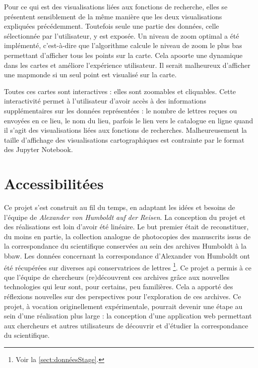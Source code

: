 \documentclass[a4paper, 12pt, twoside]{book}
\begin{document}
Pour ce qui est des visualisations liées aux fonctions de recherche, elles se présentent sensiblement de la même manière que les deux visualisations expliquées précédemment. Toutefois seule une partie des données, celle sélectionnée par l'utilisateur, y est exposée. Un niveau de zoom optimal a été implémenté, c'est-à-dire que l'algorithme calcule le niveau de zoom le plus bas permettant d'afficher tous les points sur la carte. Cela apoorte une dynamique dans les cartes et améliore l'expérience utilisateur. Il serait malheureux d'afficher une mapmonde si un seul point est visualisé sur la carte.

Toutes ces cartes sont interactives : elles sont zoomables et cliquables. Cette interactivité permet à l'utilisateur d'avoir accès à des informations supplémentaires sur les données représentées : le nombre de lettres reçues ou envoyées en ce lieu, le nom du lieu, parfois le lien vers le catalogue en ligne quand il s'agit des visualisations liées aux fonctions de recherches. Malheureusement la taille d'affichage des visualisations cartographiques est contrainte par le format des Jupyter Notebook.

\let\cleardoublepage\clearpage


\chapter{Accessibilitées}
\label{chap:accessibilités}
Ce projet s'est construit au fil du temps, en adaptant les idées et besoins de l'équipe de \textit{Alexander von Humboldt auf der Reisen}. La conception du projet et des réalisations est loin d'avoir été linéaire. Le but premier était de reconstituer, du moins en partie, la collection analogue de photocopies des manuscrits issus de la correspondance du scientifique conservées au sein des archives Humboldt à la \gls{bbaw}. Les données concernant la correspondance d'Alexander von Humboldt ont été récupérées sur diverses \gls{api} conservatrices de lettres \footnote{Voir la \autoref{sect:donnéesStage}.}.
Ce projet a permis à ce que l'équipe de chercheurs (re)découvrent ces archives grâce aux nouvelles technologies qui leur sont, pour certains, peu familières. Cela a apporté des réflexions nouvelles sur des perspectives pour l'exploration de ces archives. Ce projet, à vocation originellement expérimentale, pourrait devenir une étape au sein d'une réalisation plus large : la conception d'une application web permettant aux chercheurs et autres utilisateurs de découvrir et d'étudier la correspondance du scientifique.
\end{document}
